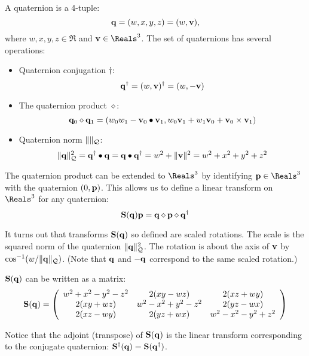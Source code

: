 A quaternion is a 4-tuple:
\begin{equation}
{\mathbf q} = (w, x, y, z) = (w, {\mathbf v}),
\end{equation}
where $w, x, y, z \in \Re$ and $\v \in \Reals^3$.
The set of quaternions has several operations:
\begin{itemize}
\item Quaternion conjugation $\dagger$:
\begin{equation}
{\mathbf q}^\dagger = (w, {\mathbf v})^\dagger = (w, - {\mathbf v})
\end{equation}
\item The quaternion product $\diamond$:
\begin{equation}
{\mathbf q}_0 \diamond {\mathbf q}_1 = (w_0w_1 - {\mathbf v}_0 \bullet {\mathbf v}_1, w_0 {\mathbf v}_1 + w_1 {\mathbf v}_0 + {\mathbf v}_0 \times {\mathbf v}_1)
\end{equation}
\item Quaternion norm $\| \|_{\mathcal{Q}}$:
\begin{equation}
\| {\mathbf q} \|_{\mathcal{Q}}^2
= {\mathbf q}^\dagger \bullet {\mathbf q}
= {\mathbf q} \bullet {\mathbf q}^\dagger
= w^2 + \|{\mathbf v}\|^2
= w^2 + x^2 + y^2 + z^2
\end{equation}
\end{itemize}

The quaternion product can be extended to $\Reals^3$
by identifying $\p \in \Reals^3$ with
the quaternion $(0,{\mathbf p})$.
This allows us to define a linear transform
on $\Reals^3$ for any quaternion:
\begin{equation}
{\mathbf S}({\mathbf q}) {\mathbf p} = {\mathbf q} \diamond {\mathbf p} \diamond {\mathbf q}^\dagger
\end{equation}

It turns out that transforms ${\mathbf S}({\mathbf q})$ so defined are scaled rotations.
The scale is the squared norm of the quaternion $\| {\mathbf q} \|_{\mathcal{Q}}^2$.
The rotation is about the axis of ${\mathbf v}$
by $\cos^{-1}(w / \| {\mathbf q} \|_{\mathcal{Q}})$.
(Note that ${\mathbf q}$ and $-{\mathbf q}$ correspond to the same scaled rotation.)

${\mathbf S}({\mathbf q})$ can be written as a matrix:
\begin{equation}
\label{eq:quaternion-matrix}
{\mathbf S}({\mathbf q}) =
\left(
\begin{array}{ccc}
w^2 + x^2 - y^2 - z^2 & 2(xy - wz)            & 2(xz + wy)           \\
2(xy + wz)            & w^2 - x^2 + y^2 - z^2 & 2(yz - wx)           \\
2(xz - wy)            & 2(yz + wx)            & w^2 - x^2 - y^2 +z^2
\end{array}
\right)
\end{equation}

Notice that the adjoint (transpose) of ${\mathbf S}({\mathbf q})$
is the linear transform corresponding to the conjugate quaternion:
${\mathbf S}^{\dagger}({\mathbf q}) =  {\mathbf S}({\mathbf q}^{\dagger})$.


